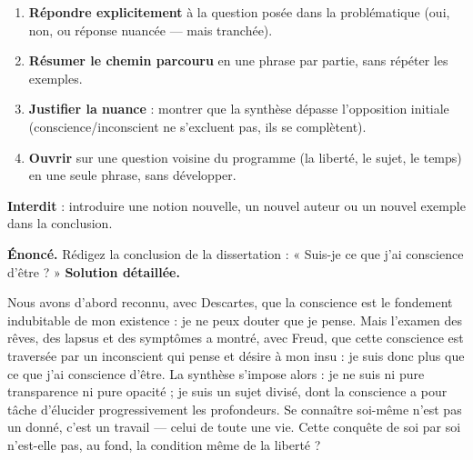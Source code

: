 \documentclass[11pt]{article}
\begin{document}
\begin{methode}
\begin{enumerate}
\item \textbf{Répondre explicitement} à la question posée dans la problématique (oui, non, ou réponse nuancée — mais tranchée).
\item \textbf{Résumer le chemin parcouru} en une phrase par partie, sans répéter les exemples.
\item \textbf{Justifier la nuance} : montrer que la synthèse dépasse l'opposition initiale (conscience/inconscient ne s'excluent pas, ils se complètent).
\item \textbf{Ouvrir} sur une question voisine du programme (la liberté, le sujet, le temps) en une seule phrase, sans développer.
\end{enumerate}
\textbf{Interdit} : introduire une notion nouvelle, un nouvel auteur ou un nouvel exemple dans la conclusion.
\end{methode}

\begin{exoresolu}
\textbf{Énoncé.} Rédigez la conclusion de la dissertation : « Suis-je ce que j'ai conscience d'être ? »
\tcblower
\textbf{Solution détaillée.}

Nous avons d'abord reconnu, avec Descartes, que la conscience est le fondement indubitable de mon existence : je ne peux douter que je pense. Mais l'examen des rêves, des lapsus et des symptômes a montré, avec Freud, que cette conscience est traversée par un inconscient qui pense et désire à mon insu : je suis donc plus que ce que j'ai conscience d'être. La synthèse s'impose alors : je ne suis ni pure transparence ni pure opacité ; je suis un sujet divisé, dont la conscience a pour tâche d'élucider progressivement les profondeurs. Se connaître soi-même n'est pas un donné, c'est un travail — celui de toute une vie. Cette conquête de soi par soi n'est-elle pas, au fond, la condition même de la liberté ?
\end{exoresolu}
\end{document}
